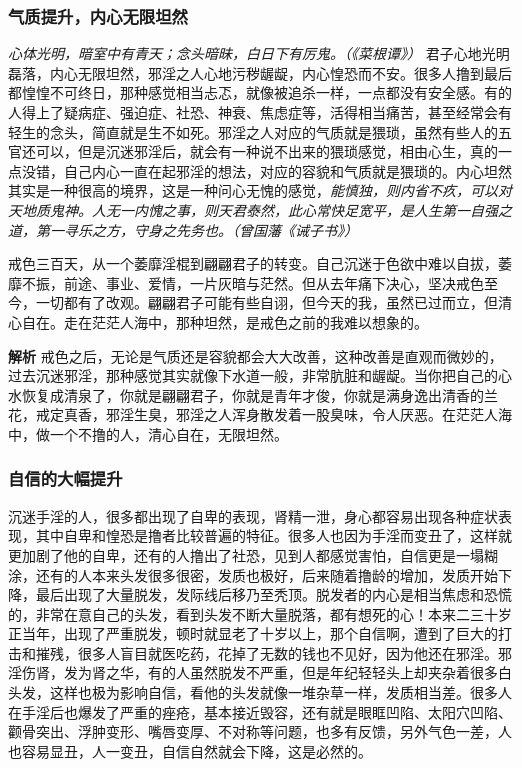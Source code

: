 \subsubsection{气质提升，内心无限坦然}

\textit{心体光明，暗室中有青天；念头暗昧，白日下有厉鬼。（《菜根谭》）} 君子心地光明磊落，内心无限坦然，邪淫之人心地污秽龌龊，内心惶恐而不安。很多人撸到最后都惶惶不可终日，那种感觉相当忐忑，就像被追杀一样，一点都没有安全感。有的人得上了疑病症、强迫症、社恐、神衰、焦虑症等，活得相当痛苦，甚至经常会有轻生的念头，简直就是生不如死。邪淫之人对应的气质就是猥琐，虽然有些人的五官还可以，但是沉迷邪淫后，就会有一种说不出来的猥琐感觉，相由心生，真的一点没错，自己内心一直在起邪淫的想法，对应的容貌和气质就是猥琐的。内心坦然其实是一种很高的境界，这是一种问心无愧的感觉，\textit{能慎独，则内省不疚，可以对天地质鬼神。人无一内愧之事，则天君泰然，此心常快足宽平，是人生第一自强之道，第一寻乐之方，守身之先务也。（曾国藩《诫子书》）}

\begin{case}
    戒色三百天，从一个萎靡淫棍到翩翩君子的转变。自己沉迷于色欲中难以自拔，萎靡不振，前途、事业、爱情，一片灰暗与茫然。但从去年痛下决心，坚决戒色至今，一切都有了改观。翩翩君子可能有些自诩，但今天的我，虽然已过而立，但清心自在。走在茫茫人海中，那种坦然，是戒色之前的我难以想象的。

    \textbf{解析} 戒色之后，无论是气质还是容貌都会大大改善，这种改善是直观而微妙的，过去沉迷邪淫，那种感觉其实就像下水道一般，非常肮脏和龌龊。当你把自己的心水恢复成清泉了，你就是翩翩君子，你就是青年才俊，你就是满身逸出清香的兰花，戒定真香，邪淫生臭，邪淫之人浑身散发着一股臭味，令人厌恶。在茫茫人海中，做一个不撸的人，清心自在，无限坦然。
\end{case}

\subsubsection{自信的大幅提升}

沉迷手淫的人，很多都出现了自卑的表现，肾精一泄，身心都容易出现各种症状表现，其中自卑和惶恐是撸者比较普遍的特征。很多人也因为手淫而变丑了，这样就更加剧了他的自卑，还有的人撸出了社恐，见到人都感觉害怕，自信更是一塌糊涂，还有的人本来头发很多很密，发质也极好，后来随着撸龄的增加，发质开始下降，最后出现了大量脱发，发际线后移乃至秃顶。脱发者的内心是相当焦虑和恐慌的，非常在意自己的头发，看到头发不断大量脱落，都有想死的心！本来二三十岁正当年，出现了严重脱发，顿时就显老了十岁以上，那个自信啊，遭到了巨大的打击和摧残，很多人盲目就医吃药，花掉了无数的钱也不见好，因为他还在邪淫。邪淫伤肾，发为肾之华，有的人虽然脱发不严重，但是年纪轻轻头上却夹杂着很多白头发，这样也极为影响自信，看他的头发就像一堆杂草一样，发质相当差。很多人在手淫后也爆发了严重的痤疮，基本接近毁容，还有就是眼眶凹陷、太阳穴凹陷、颧骨突出、浮肿变形、嘴唇变厚、不对称等问题，也多有反馈，另外气色一差，人也容易显丑，人一变丑，自信自然就会下降，这是必然的。

